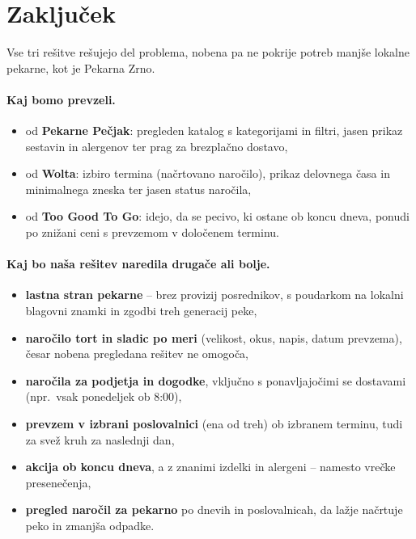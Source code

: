 \documentclass[11pt,a4paper]{article}
\begin{document}
\section{Zaključek}

Vse tri rešitve rešujejo del problema, nobena pa ne pokrije potreb manjše
lokalne pekarne, kot je Pekarna Zrno.

\paragraph{Kaj bomo prevzeli.}
\begin{itemize}
  \item od \textbf{Pekarne Pečjak}: pregleden katalog s kategorijami in filtri,
        jasen prikaz sestavin in alergenov ter prag za brezplačno dostavo,
  \item od \textbf{Wolta}: izbiro termina (načrtovano naročilo), prikaz
        delovnega časa in minimalnega zneska ter jasen status naročila,
  \item od \textbf{Too Good To Go}: idejo, da se pecivo, ki ostane ob koncu
        dneva, ponudi po znižani ceni s prevzemom v določenem terminu.
\end{itemize}

\paragraph{Kaj bo naša rešitev naredila drugače ali bolje.}
\begin{itemize}
  \item \textbf{lastna stran pekarne} -- brez provizij posrednikov, s
        poudarkom na lokalni blagovni znamki in zgodbi treh generacij peke,
  \item \textbf{naročilo tort in sladic po meri} (velikost, okus, napis,
        datum prevzema), česar nobena pregledana rešitev ne omogoča,
  \item \textbf{naročila za podjetja in dogodke}, vključno s ponavljajočimi se
        dostavami (npr.\ vsak ponedeljek ob 8:00),
  \item \textbf{prevzem v izbrani poslovalnici} (ena od treh) ob izbranem
        terminu, tudi za svež kruh za naslednji dan,
  \item \textbf{akcija ob koncu dneva}, a z znanimi izdelki in alergeni
        -- namesto vrečke presenečenja,
  \item \textbf{pregled naročil za pekarno} po dnevih in poslovalnicah, da
        lažje načrtuje peko in zmanjša odpadke.
\end{itemize}
\end{document}
